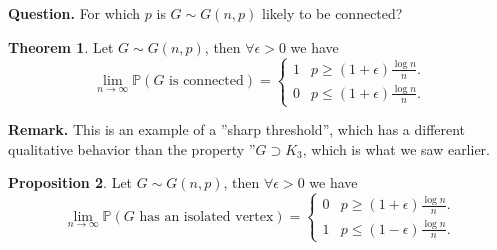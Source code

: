 \documentclass{article}
\theoremstyle{definition}
\newtheorem{theorem}{Theorem}[section]
\newtheorem{prop}[theorem]{Proposition}
\begin{document}
\textbf{Question.} For which $p$ is $G\sim G(n,p)$ likely to be connected? 
\begin{theorem}\label{6.4}
    Let $G \sim G(n,p)$, then $\forall \epsilon>0$ we have \[
    \lim_{n \to \infty} \mathbb{P}(G \text{ is connected}) = \begin{cases}
        1 &p\ge (1+\epsilon)\frac{\log n}{n}.\\
        0 &p\le (1+\epsilon)\frac{\log n}{n}.
    \end{cases}
    \]
\end{theorem}
\textbf{Remark.} This is an example of a ''sharp threshold'', which has a different qualitative behavior than the property ''$G \supset K_3$, which is what we saw earlier.
\begin{prop}
    Let $G\sim G(n,p)$, then $\forall \epsilon>0$ we have \[
    \lim_{n \to \infty}\mathbb{P}(G \text{ has an isolated vertex})=\begin{cases}
        0 &p\ge (1+\epsilon)\frac{\log n}{n}.\\
        1 &p\le (1-\epsilon)\frac{\log n}{n}.
    \end{cases}
    \]
\end{prop}
\end{document}
